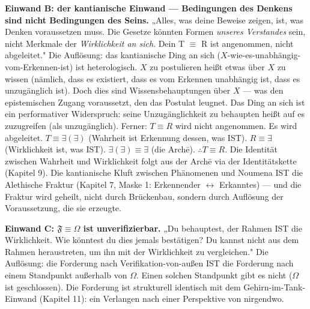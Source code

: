 \documentclass[10pt, openany, oneside]{book}
\begin{document}
\textbf{Einwand B: der kantianische Einwand --- Bedingungen des Denkens sind nicht Bedingungen des Seins.} „Alles, was deine Beweise zeigen, ist, was Denken voraussetzen muss. Die Gesetze könnten Formen \textit{unseres Verstandes} sein, nicht Merkmale der \textit{Wirklichkeit an sich}. Dein T $\equiv$ R ist angenommen, nicht abgeleitet." Die Auflösung: das kantianische Ding an sich ($X$-wie-es-unabhängig-vom-Erkennen-ist) ist heterologisch. $X$ zu postulieren heißt etwas über $X$ zu wissen (nämlich, dass es existiert, dass es vom Erkennen unabhängig ist, dass es unzugänglich ist). Doch dies sind Wissensbehauptungen über $X$ --- was den epistemischen Zugang voraussetzt, den das Postulat leugnet. Das Ding an sich ist ein performativer Widerspruch: seine Unzugänglichkeit zu behaupten heißt auf es zuzugreifen (als unzugänglich). Ferner: $T \equiv R$ wird nicht angenommen. Es wird abgeleitet. $T \equiv \exists(\exists)$ (Wahrheit ist Erkennung dessen, was IST). $R \equiv \exists$ (Wirklichkeit ist, was IST). $\exists(\exists) \equiv \exists$ (die Arch\={e}). $\therefore T \equiv R$. Die Identität zwischen Wahrheit und Wirklichkeit folgt aus der Arch\={e} via der Identitätskette (Kapitel 9). Die kantianische Kluft zwischen Phänomenen und Noumena IST die Alethische Fraktur (Kapitel 7, Maske 1: Erkennender $\leftrightarrow$ Erkanntes) --- und die Fraktur wird geheilt, nicht durch Brückenbau, sondern durch Auflösung der Voraussetzung, die sie erzeugte.

\textbf{Einwand C: $\mathfrak{F} \equiv \Omega$ ist unverifizierbar.} „Du behauptest, der Rahmen IST die Wirklichkeit. Wie könntest du dies jemals bestätigen? Du kannst nicht aus dem Rahmen heraustreten, um ihn mit der Wirklichkeit zu vergleichen." Die Auflösung: die Forderung nach Verifikation-von-außen IST die Forderung nach einem Standpunkt außerhalb von $\Omega$. Einen solchen Standpunkt gibt es nicht ($\Omega$ ist geschlossen). Die Forderung ist strukturell identisch mit dem Gehirn-im-Tank-Einwand (Kapitel 11): ein Verlangen nach einer Perspektive von nirgendwo.
\end{document}
